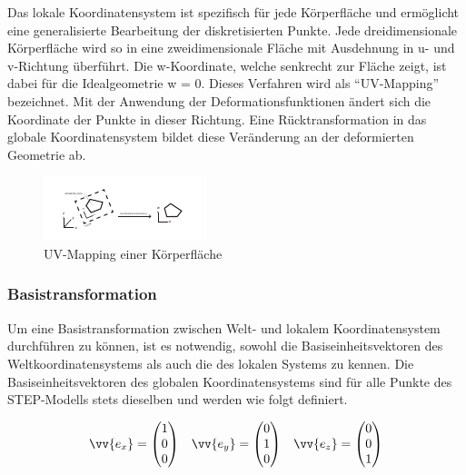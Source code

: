 Das lokale Koordinatensystem ist spezifisch für jede Körperfläche und ermöglicht eine generalisierte Bearbeitung der diskretisierten Punkte. Jede dreidimensionale Körperfläche wird so in eine zweidimensionale Fläche mit Ausdehnung in u- und v-Richtung überführt. Die w-Koordinate, welche senkrecht zur Fläche zeigt, ist dabei für die Idealgeometrie w = 0. Dieses Verfahren wird als "`UV-Mapping"' bezeichnet. Mit der Anwendung der Deformationsfunktionen ändert sich die Koordinate der Punkte in dieser Richtung. Eine Rücktransformation in das globale Koordinatensystem bildet diese Veränderung an der deformierten Geometrie ab.       

\begin{figure}[h]
	\centering
	
	\includegraphics[width=\linewidth]{img/uvwmapping.pdf}
	
	\caption{UV-Mapping einer Körperfläche}
	\label{fig:uvwmapping}
	
\end{figure}
 
\subsubsection{Basistransformation}
\label{sec:basetransform}


Um eine Basistransformation zwischen Welt- und lokalem Koordinatensystem durchführen zu können, ist es notwendig, sowohl die Basiseinheitsvektoren des Weltkoordinatensystems als auch die des lokalen Systems zu kennen. Die Basiseinheitsvektoren des globalen Koordinatensystems sind für alle Punkte des STEP-Modells stets dieselben und werden wie folgt definiert.

\begin{singlespace}
	\begin{equation}
	\begin{aligned}
	\vv{e_{x}}=\begin{pmatrix}
	1 \\ 
	0 \\ 
	0
	\end{pmatrix}  
	&& 
	\vv{e_{y}}=\begin{pmatrix}
	0 \\ 
	1 \\ 
	0
	\end{pmatrix}  
	&& 
	\vv{e_{z}}=\begin{pmatrix}
	0 \\ 
	0 \\ 
	1
	\end{pmatrix} 
	\end{aligned}
	\end{equation}
\end{singlespace}

